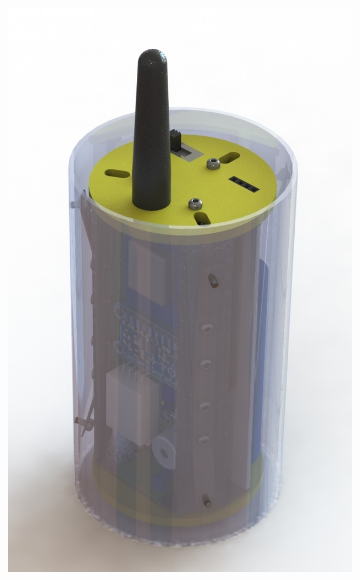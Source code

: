 \documentclass[]{report}
\begin{document}
\begin{figure}
	\centering
	\begin{subfigure}{.5\textwidth}
		\centering
		\includegraphics[width=.8\linewidth]{Old_CanSat_render.jpg}
	\end{subfigure}%
	\begin{subfigure}{.5\textwidth}
		\centering

\end{subfigure}
\end{figure}
\end{document}
